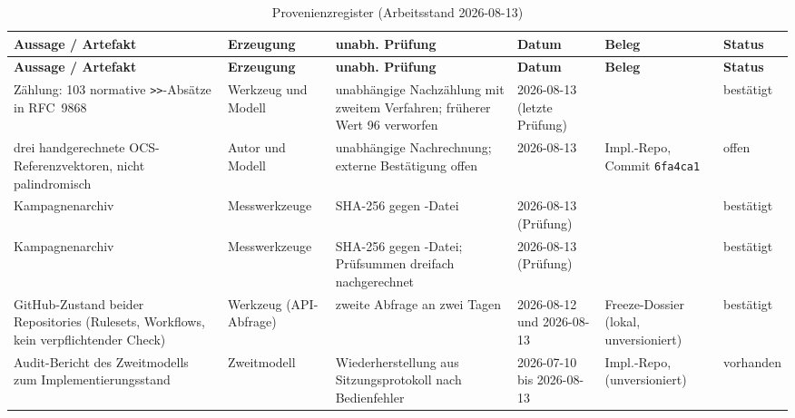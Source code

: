 \begin{footnotesize}
\begin{longtable}{@{}L{3.7cm}L{1.7cm}L{2.3cm}L{1.5cm}L{2.0cm}L{1.3cm}@{}}
  \caption{Provenienzregister (Arbeitsstand 2026-08-13)}
  \label{tab:provenienzregister} \\
  \toprule
  \textbf{Aussage / Artefakt} & \textbf{Erzeugung} & \textbf{unabh. Prüfung} & \textbf{Datum} &
    \textbf{Beleg} & \textbf{Status} \\
  \midrule
  \endfirsthead
  \toprule
  \textbf{Aussage / Artefakt} & \textbf{Erzeugung} & \textbf{unabh. Prüfung} & \textbf{Datum} &
    \textbf{Beleg} & \textbf{Status} \\
  \midrule
  \endhead
  \bottomrule
  \endfoot
  Zählung: 103 normative \texttt{>{}>}-Absätze in RFC~9868
    & Werkzeug und Modell
    & unabhängige Nachzählung mit zweitem Verfahren; früherer Wert 96 verworfen
    & 2026-08-13 (letzte Prüfung)
    & 
    & bestätigt \\
  drei handgerechnete OCS-Referenzvektoren, nicht palindromisch
    & Autor und Modell
    & unabhängige Nachrechnung; externe Bestätigung offen
    & 2026-08-13
    & Impl.-Repo, Commit \texttt{6fa4ca1}
    & offen \\
  Kampagnenarchiv\newline{}\newline{}\newline{}
    & Messwerkzeuge
    & SHA-256 gegen -Datei
    & 2026-08-13 (Prüfung)
    & 
    & bestätigt \\
  Kampagnenarchiv\newline{}\newline{}
    & Messwerkzeuge
    & SHA-256 gegen -Datei; Prüfsummen dreifach nachgerechnet
    & 2026-08-13 (Prüfung)
    & 
    & bestätigt \\
  GitHub-Zustand beider Repositories (Rulesets, Workflows, kein verpflichtender Check)
    & Werkzeug (API-Abfrage)
    & zweite Abfrage an zwei Tagen
    & 2026-08-12 und 2026-08-13
    & Freeze-Dossier (lokal, unversioniert)
    & bestätigt \\
  Audit-Bericht des Zweitmodells zum Implementierungsstand
    & Zweitmodell
    & Wiederherstellung aus Sitzungsprotokoll nach Bedienfehler
    & 2026-07-10 bis 2026-08-13
    & Impl.-Repo,  (unversioniert)
    & vorhanden \\

\end{longtable}
\end{footnotesize}
